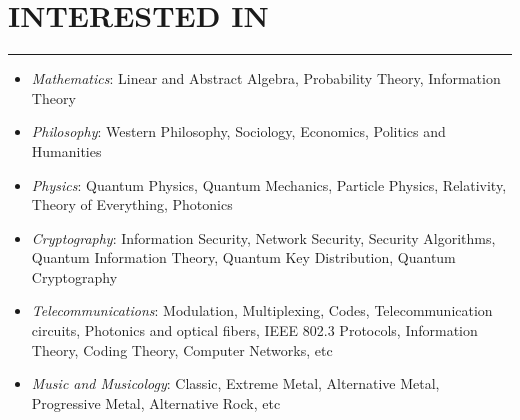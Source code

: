 \documentclass[10pt,a4paper]{article}
\begin{document}
\section{INTERESTED IN}
\noindent \rule {3.2cm}{0.4pt}
  \begin{itemize}
    \setlength{\rightskip}{2cm}
    \setlength\itemsep{0em}
    \item \small \textit{Mathematics}: Linear and Abstract Algebra, Probability Theory, Information Theory
	  \item \small \textit{Philosophy}: Western Philosophy, Sociology, Economics, Politics and Humanities
	  \item \small \textit{Physics}: Quantum Physics, Quantum Mechanics, Particle Physics, Relativity, Theory of Everything, Photonics 
	  \item \small \textit{Cryptography}: Information Security, Network Security, Security Algorithms, Quantum Information Theory, Quantum Key Distribution, Quantum Cryptography 
	  \item \small \textit{Telecommunications}: Modulation, Multiplexing, Codes, Telecommunication circuits, Photonics and optical fibers, IEEE 802.3 Protocols, Information Theory, Coding Theory, Computer Networks, etc 
    \item \small \textit{Music and Musicology}: Classic, Extreme Metal, Alternative Metal, Progressive Metal, Alternative Rock, etc
  \end{itemize}
\end{document}
